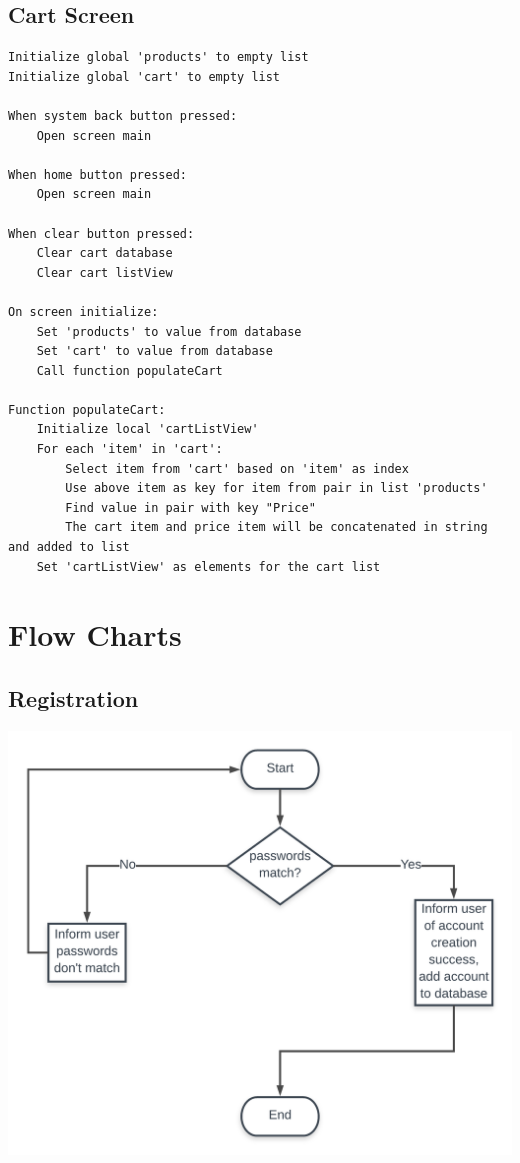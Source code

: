 \documentclass{scrreprt}
\begin{document}
\subsection*{Cart Screen}

\begin{lstlisting}
Initialize global 'products' to empty list
Initialize global 'cart' to empty list

When system back button pressed:
    Open screen main
    
When home button pressed:
    Open screen main
    
When clear button pressed:
    Clear cart database
    Clear cart listView
    
On screen initialize:
    Set 'products' to value from database
    Set 'cart' to value from database
    Call function populateCart
    
Function populateCart:
    Initialize local 'cartListView'
    For each 'item' in 'cart':
        Select item from 'cart' based on 'item' as index
        Use above item as key for item from pair in list 'products'
        Find value in pair with key "Price"
        The cart item and price item will be concatenated in string and added to list
    Set 'cartListView' as elements for the cart list
\end{lstlisting}

\section{Flow Charts}

\subsection*{Registration}

\begin{center}
    \includegraphics[width=0.9\linewidth]{images/flowRegister.png}
\end{center}
\end{document}
